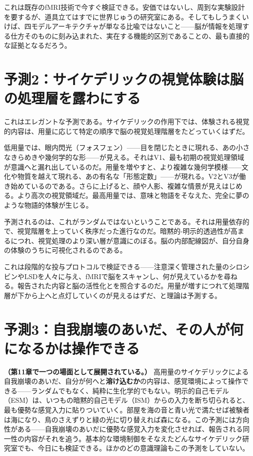 \documentclass[11pt, twoside, openright]{book}
\begin{document}
これは既存のfMRI技術で今すぐ検証できる。安価ではないし、周到な実験設計を要するが、道具立てはすでに世界じゅうの研究室にある。そしてもしうまくいけば、四モデルアーキテクチャが単なる比喩ではないこと------脳が情報を処理する仕方そのものに刻み込まれた、実在する機能的区別であることの、最も直接的な証拠となるだろう。

\section*{予測2：サイケデリックの視覚体験は脳の処理層を露わにする}

これはエレガントな予測である。サイケデリックの作用下では、体験される視覚的内容は、用量に応じて特定の順序で脳の視覚処理階層をたどっていくはずだ。

低用量では、眼内閃光（フォスフェン）------目を閉じたときに現れる、あの小さなきらめきや幾何学的な形------が見える。それはV1、最も初期の視覚処理領域が意識へと漏れ出しているのだ。用量を増やすと、より複雑な幾何学模様------文化や物質を越えて現れる、あの有名な「形態定数」------が現れる。V2とV3が働き始めているのである。さらに上げると、顔や人影、複雑な情景が見えはじめる。より高次の視覚領域だ。最高用量では、意味と物語をそなえた、完全に夢のような物語的体験が生じる。

予測されるのは、これがランダムではないということである。それは用量依存的で、視覚階層を上っていく秩序だった進行なのだ。暗黙的-明示的透過性が高まるにつれ、視覚処理のより深い層が意識にのぼる。脳の内部配線図が、自分自身の体験のうちに可視化されるのである。

これは段階的な投与プロトコルで検証できる------注意深く管理された量のシロシビンやLSDを人々に与え、fMRIで脳をスキャンし、何が見えているかを尋ねる。報告された内容と脳の活性化とを照合するのだ。用量が増すにつれて処理階層が下から上へと点灯していくのが見えるはずだ、と理論は予測する。

\section*{予測3：自我崩壊のあいだ、その人が何になるかは操作できる}

\textbf{（第11章で一つの場面として展開されている。）} 高用量のサイケデリックによる自我崩壊のあいだ、自分が何へと\textbf{溶け込むか}の内容は、感覚環境によって操作できる------ランダムでもなく、純粋に生化学的でもない。明示的自己モデル（ESM）は、いつもの暗黙的自己モデル（ISM）からの入力を断ち切られると、最も優勢な感覚入力に貼りついていく。部屋を海の音と青い光で満たせば被験者は海になり、鳥のさえずりと緑の光に切り替えれば森になる。この予測には方向性がある------自我崩壊のあいだに優勢な感覚入力を変化させれば、報告される同一性の内容がそれを追う。基本的な環境制御をそなえたどんなサイケデリック研究室でも、今日にも検証できる。ほかのどの意識理論もこの予測をしていない。
\end{document}
